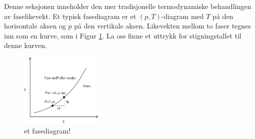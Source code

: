 Denne seksjonen inneholder den mer tradisjonelle termodynamiske behandlingen av faselikevekt. Et typisk fasediagram er et $(p,T)$-diagram med $T$ på den horisontale aksen og $p$ på den vertikale aksen. Likevekten mellom to faser tegnes inn som en kurve, som i Figur \ref{fig:fasediagram}. La oss finne et uttrykk for stigningstallet til denne kurven.

\begin{figure}[H]
	\centering
	\includegraphics[width=0.35\textwidth]{eigenfig/phase.png}
	\caption{et fasediagram!}
	\label{fig:fasediagram}
\end{figure}

